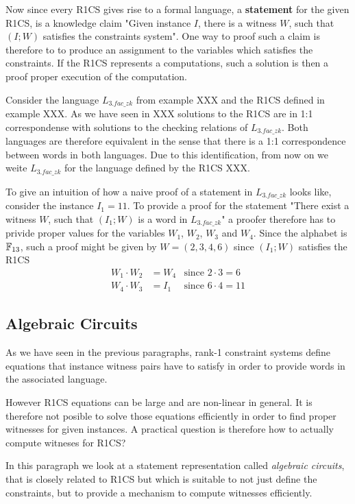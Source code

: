 Now since every R1CS gives rise to a formal language, a \textbf{statement} for the given R1CS, is a knowledge claim "Given instance $I$, there is a witness $W$, such that $(I;W)$ satisfies the constraints system". One way to proof such a claim is therefore to to produce an assignment to the variables which satisfies the constraints. If the R1CS represents a computations, such a solution is then a proof proper execution of the computation.
\begin{example}[3-Factorization]Consider the language $L_{3.fac\_zk}$ from example XXX and the R1CS defined in example XXX. As we have seen in XXX solutions to the R1CS are in 1:1 correspondense with solutions to the checking relations of $L_{3.fac\_zk}$. Both languages are therefore equivalent in the sense that there is a 1:1 correspondence between words in both languages. Due to this identification, from now on we weite $L_{3.fac\_zk}$ for the language defined by the R1CS XXX.

To give an intuition of how a naive proof of a statement in $L_{3.fac\_zk}$ looks like, consider the instance $I_1= 11$. To provide a proof for the statement "There exist a witness $W$, such that $(I_1;W)$ is a word in $L_{3.fac\_zk}$" a proofer therefore has to privide proper values for the variables $W_1$, $W_2$, $W_3$ and $W_4$. Since the alphabet is $\mathbb{F}_{13}$, such a proof might be given by
$W=(2,3,4,6)$ since $(I_1;W)$ satisfies the R1CS
\begin{align*}
W_1 \cdot W_2 &= W_4 & \text{since } 2\cdot 3 = 6\\
W_4 \cdot W_3 &= I_1 & \text{since } 6\cdot 4 = 11
\end{align*}
\end{example}


\subsection{Algebraic Circuits} As we have seen in the previous paragraphs, rank-1 constraint systems define equations that instance witness pairs have to satisfy in order to provide words in the associated language.

However R1CS equations can be large and are non-linear in general. It is therefore not posible to solve those equations efficiently in order to find proper witnesses for given instances. A practical question is therefore how to actually compute witneses for R1CS?

In this paragraph we look at a statement representation called \textit{algebraic circuits}, that is closely related to R1CS but which is suitable to not just define the constraints, but to provide a mechanism to compute witnesses efficiently.

